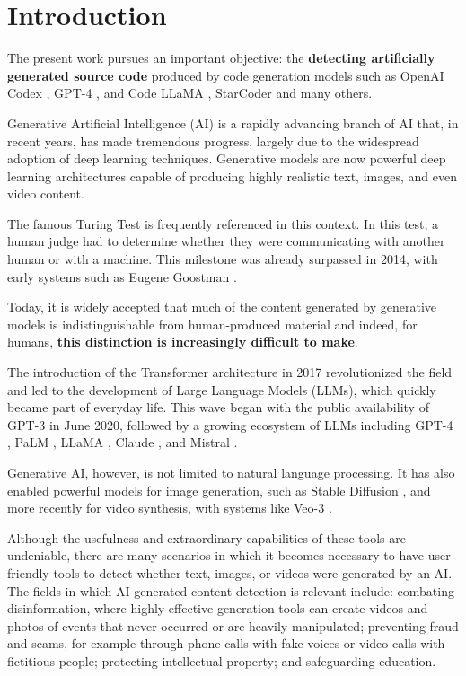 \clearpage
\chapter{Introduction}

The present work pursues an important objective: the
\textbf{detecting artificially generated source code} produced by code generation 
models such as OpenAI Codex \cite{chen2021codex}, GPT-4 \cite{openai2023gpt4}, 
and Code LLaMA \cite{roziere2023code}, StarCoder \cite{li2023starcoder} and many others.


Generative Artificial Intelligence (AI) is a rapidly advancing 
branch of AI that, in recent years, has made 
tremendous progress, largely due to the widespread adoption of 
deep learning techniques. Generative models 
are now powerful deep learning architectures capable of producing 
highly realistic text, images, and even video content.


The famous Turing Test is frequently referenced in this context. 
In this test, a human judge had to determine whether they were 
communicating with another human or with a machine. This milestone 
was already surpassed in 2014, with early systems such as Eugene Goostman 
\cite{warwick2016turing}.


Today, it is widely accepted that much of the content generated by 
generative models is indistinguishable from human-produced material
and indeed, for humans, \textbf{this distinction is increasingly difficult 
to make}.


The introduction of the Transformer architecture in 2017 
\cite{vaswani2017attention} revolutionized the field 
and led to the development of Large Language Models (LLMs), 
which quickly became part of everyday life. This wave began 
with the public availability of GPT-3 \cite{brown2020language} 
in June 2020, followed by a growing ecosystem of 
LLMs including GPT-4 \cite{openai2023gpt4}, PaLM 
\cite{chowdhery2022palm}, LLaMA \cite{touvron2023llama}, 
Claude \cite{anthropic2023claude}, and Mistral \cite{jiang2023mistral}.

Generative AI, however, is not limited to natural language 
processing. It has also enabled powerful models for image 
generation, such as Stable Diffusion \cite{rombach2022high}, 
and more recently for video 
synthesis, with systems like Veo-3 \cite{google2024veo}.


Although the usefulness and extraordinary capabilities of these 
tools are undeniable, there are many scenarios in which it becomes 
necessary to have user-friendly tools to detect whether text, images, 
or videos were generated by an AI.
The fields in which AI-generated content detection is relevant 
include: combating disinformation, where highly effective 
generation tools can create videos and photos of events that 
never occurred or are heavily manipulated; preventing fraud 
and scams, for example through phone calls with fake voices 
or video calls with fictitious people; protecting intellectual 
property; and safeguarding education.


